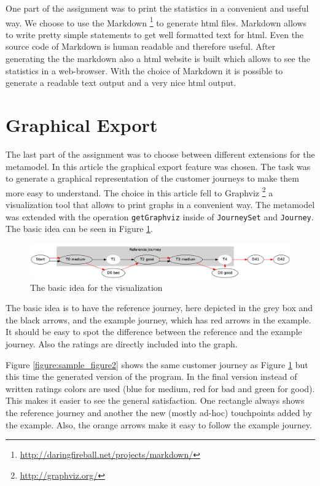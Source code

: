 \documentclass[12pt]{scrartcl}
\begin{document}
One part of the assignment was to print the statistics in a convenient and useful way. We choose to use the 
Markdown \footnote{\url{http://daringfireball.net/projects/markdown/}} to generate html files. Markdown allows
to write pretty simple statements to get well formatted text for html. Even the source code of Markdown is 
human readable and therefore useful. After generating the the markdown also a html website is built which allows
to see the statistics in a web-browser. With the choice of Markdown it is possible to generate a readable text
output and a very nice html output.

\section{Graphical Export} 
\label{section:export}

The last part of the assignment was to choose between different extensions for the metamodel. In this article
the graphical export feature was chosen. The task was to generate a graphical representation of the customer
journeys to make them more easy to understand. The choice in this article fell to Graphviz 
\footnote{\url{http://graphviz.org/}} a visualization tool that allows to print graphs in a convenient way.
The metamodel was extended with the operation \lstinline!getGraphviz! inside of \lstinline!JourneySet! and
\lstinline!Journey!. The basic idea can be seen in Figure \ref{figure:sample_figure}.

\begin{figure}[hbtp]
	\centering
	\includegraphics[scale=0.35]{img/sample_journey1.png}
	\caption{The basic idea for the visualization}
	\label{figure:sample_figure}
\end{figure}

The basic idea is to have the reference journey, here depicted in the grey box and the black arrows, and the 
example journey, which has red arrows in the example. It should be easy to spot the difference between the
reference and the example journey. Also the ratings are directly included into the graph.

Figure \ref{figure:sample_figure2} shows the same customer journey as Figure \ref{figure:sample_figure} but this
time the generated version of the program. In the final version instead of written ratings colors are used (blue for
medium, red for bad and green for good). This makes it easier to see the general satisfaction. One rectangle always
shows the reference journey and another the new (mostly ad-hoc) touchpoints added by the example. Also, the orange
arrows make it easy to follow the example journey.
\end{document}
